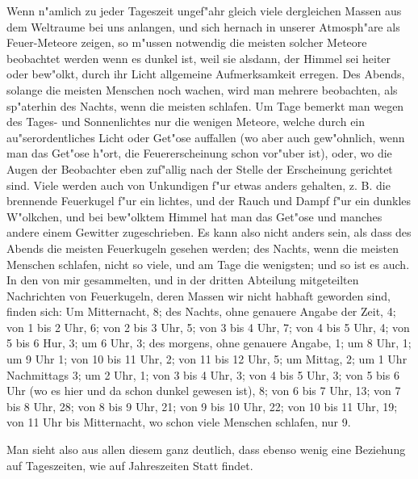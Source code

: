 \documentclass[a4paper, 11pt, oneside, polutonikogreek, german]{article}
\begin{document}
Wenn n"amlich zu jeder Tageszeit ungef"ahr gleich viele dergleichen Massen aus dem Weltraume bei uns anlangen, und sich hernach in unserer Atmosph"are als Feuer-Meteore zeigen, so m"ussen notwendig die meisten solcher Meteore beobachtet werden wenn es dunkel ist, weil sie alsdann, der Himmel sei heiter oder bew"olkt, durch ihr Licht allgemeine Aufmerksamkeit erregen. Des Abends, solange die meisten Menschen noch wachen, wird man mehrere beobachten, als sp"aterhin des Nachts, wenn die meisten schlafen. Um Tage bemerkt man wegen des Tages- und Sonnenlichtes nur die wenigen Meteore, welche durch ein au"serordentliches Licht oder Get"ose auffallen (wo aber auch gew"ohnlich, wenn man das Get"ose h"ort, die Feuererscheinung schon vor"uber ist), oder, wo die Augen der Beobachter eben zuf"allig nach der Stelle der Erscheinung gerichtet sind. Viele werden auch von Unkundigen f"ur etwas anders gehalten, z. B. die brennende Feuerkugel f"ur ein lichtes, und der Rauch und Dampf f"ur ein dunkles W"olkchen, und bei bew"olktem Himmel hat man das Get"ose und manches andere einem Gewitter zugeschrieben. Es kann also nicht anders sein, als dass des Abends die meisten Feuerkugeln gesehen werden; des Nachts, wenn die meisten Menschen schlafen, nicht so viele, und am Tage die wenigsten; und so ist es auch. In den von mir gesammelten, und in der dritten Abteilung mitgeteilten Nachrichten von Feuerkugeln, deren Massen wir nicht habhaft geworden sind, finden sich: Um Mitternacht, 8; des Nachts, ohne genauere Angabe der Zeit, 4; von 1 bis 2 Uhr, 6; von 2 bis 3 Uhr, 5; von 3 bis 4 Uhr, 7; von 4 bis 5 Uhr, 4; von 5 bis 6 Hur, 3; um 6 Uhr, 3; des morgens, ohne genauere Angabe, 1; um 8 Uhr, 1; um 9 Uhr 1; von 10 bis 11 Uhr, 2; von 11 bis 12 Uhr, 5; um Mittag, 2; um 1 Uhr Nachmittags 3; um 2 Uhr, 1; von 3 bis 4 Uhr, 3; von 4 bis 5 Uhr, 3; von 5 bis 6 Uhr (wo es hier und da schon dunkel gewesen ist), 8; von 6 bis 7 Uhr, 13; von 7 bis 8 Uhr, 28; von 8 bis 9 Uhr, 21; von 9 bis 10 Uhr, 22; von 10 bis 11 Uhr, 19; von 11 Uhr bis Mitternacht, wo schon viele Menschen schlafen, nur 9.

Man sieht also aus allen diesem ganz deutlich, dass ebenso wenig eine Beziehung auf Tageszeiten, wie auf Jahreszeiten Statt findet.
\subsection{}
\end{document}
